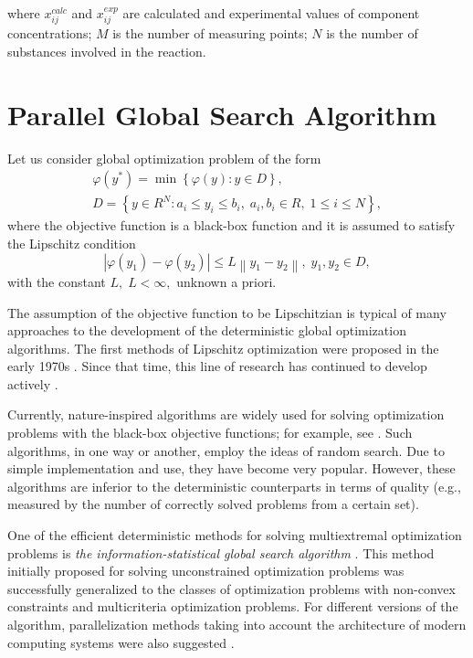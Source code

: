 \documentclass{svproc}
\begin{document}
where $x_{ij}^{calc}$ and $x_{ij}^{exp}$ are calculated and experimental values of component concentrations; $M$ is the number of measuring points; $N$ is the number of substances involved in the reaction.

\section{Parallel Global Search Algorithm}\label{Sec_GSA}

Let us consider global optimization problem of the form 
\begin{gather}
 \varphi(y^\ast)=\min{\left\{\varphi(y):y\in D\right\}}, \label{problem}\\
 D=\left\{y\in R^N: a_i\leq y_i \leq b_i, \; a_i,b_i\in R, \;  1\leq i \leq N\right\} \label{D},
\end{gather}
where the objective function is a black-box function and it is assumed to satisfy the Lipschitz condition
\[
\left|\varphi(y_1)-\varphi(y_2)\right|\leq L\left\|y_1-y_2\right\|,\; y_1,y_2 \in D,
\]
with the constant $L, \; L<\infty,$ unknown a priori.

The assumption of the objective function to be Lipschitzian is typical of many approaches to the development of the deterministic global optimization algorithms.
The first methods of Lipschitz optimization were proposed in the early 1970s \cite{Piyavskii1972,Shubert1972}. Since that time, this line of research has continued to develop actively \cite{Evtushenko2013,Zilinskas2010,Pinter1996,Jones2009}.

Currently, nature-inspired algorithms are widely used for solving optimization problems with the black-box objective functions; for example, see \cite{Yang2013,Gendreau2010,Eiben2015}. Such algorithms, in one way or another, employ the ideas of random search. Due to simple implementation and use, they have become very popular. However, these algorithms are inferior to the deterministic counterparts in terms of quality \cite{Kvasov2018,Sergeyev2018} (e.g., measured by the number of correctly solved problems from a certain set).

One of the efficient deterministic methods for solving multiextremal optimization problems is \textit{the information-statistical global search algorithm} \cite{Strongin2000}. This method initially proposed for solving unconstrained optimization problems was successfully generalized to the classes of optimization problems with non-convex constraints and multicriteria optimization problems. For different versions of the algorithm, parallelization methods taking into account the architecture of modern computing systems were also suggested \cite{Barkalov2016,globalizerSystem,Strongin2018}.%
\end{document}
